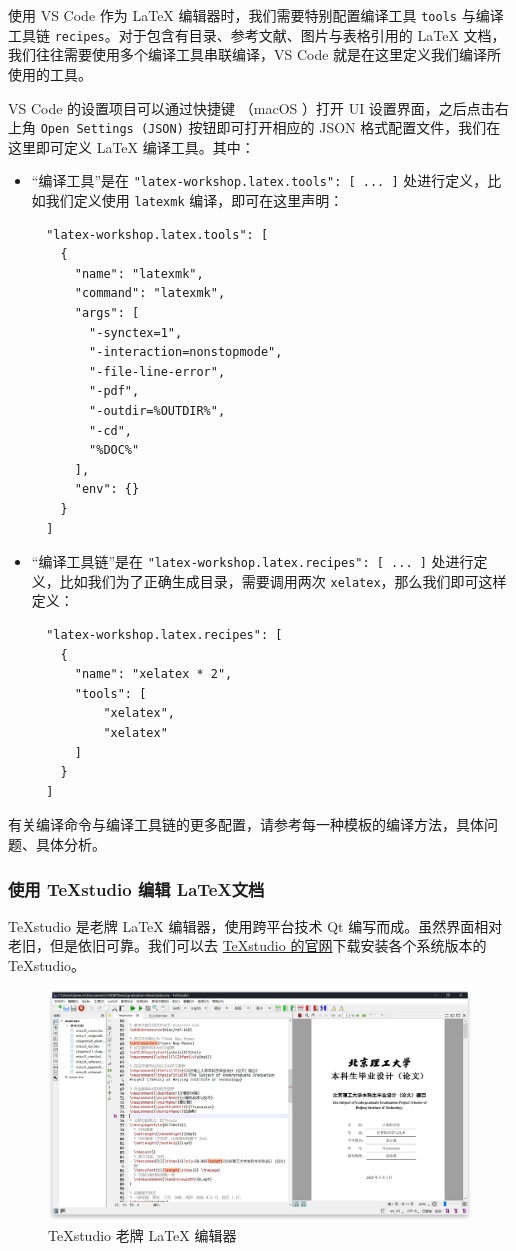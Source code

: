 使用 VS Code 作为 {\LaTeX} 编辑器时，我们需要特别配置编译工具 \texttt{tools} 与编译工具链 \texttt{recipes}。对于包含有目录、参考文献、图片与表格引用的 {\LaTeX} 文档，我们往往需要使用多个编译工具串联编译，VS Code 就是在这里定义我们编译所使用的工具。

VS Code 的设置项目可以通过快捷键 \keys{\ctrl + ,}（macOS \keys{\cmd + ,}）打开 UI 设置界面，之后点击右上角 \texttt{Open Settings (JSON)} 按钮即可打开相应的 JSON 格式配置文件，我们在这里即可定义 {\LaTeX} 编译工具。其中：

\begin{itemize}
  \item “编译工具”是在 \texttt{"latex-workshop.latex.tools": [ ... ]} 处进行定义，比如我们定义使用 \texttt{latexmk} 编译，即可在这里声明：
  \begin{verbatim}
  "latex-workshop.latex.tools": [
    {
      "name": "latexmk",
      "command": "latexmk",
      "args": [
        "-synctex=1",
        "-interaction=nonstopmode",
        "-file-line-error",
        "-pdf",
        "-outdir=%OUTDIR%",
        "-cd",
        "%DOC%"
      ],
      "env": {}
    }
  ]
  \end{verbatim}
  \item “编译工具链”是在 \texttt{"latex-workshop.latex.recipes": [ ... ]} 处进行定义，比如我们为了正确生成目录，需要调用两次 \texttt{xelatex}，那么我们即可这样定义：
  \begin{verbatim}
  "latex-workshop.latex.recipes": [
    {
      "name": "xelatex * 2",
      "tools": [
          "xelatex",
          "xelatex"
      ]
    }
  ]
  \end{verbatim}
\end{itemize}

有关编译命令与编译工具链的更多配置，请参考每一种模板的编译方法，具体问题、具体分析。

\subsubsection{使用 \TeX studio 编辑 \LaTeX 文档}
\TeX studio 是老牌 {\LaTeX} 编辑器，使用跨平台技术 Qt 编写而成。虽然界面相对老旧，但是依旧可靠。我们可以去 \href{https://www.texstudio.org/}{\TeX studio 的官网}下载安装各个系统版本的 \TeX studio。

\begin{figure}[H]
  \centering
  \includegraphics[width=\textwidth]{images/texstudio.png}
  \caption{\TeX studio 老牌 {\LaTeX} 编辑器}
\end{figure}


